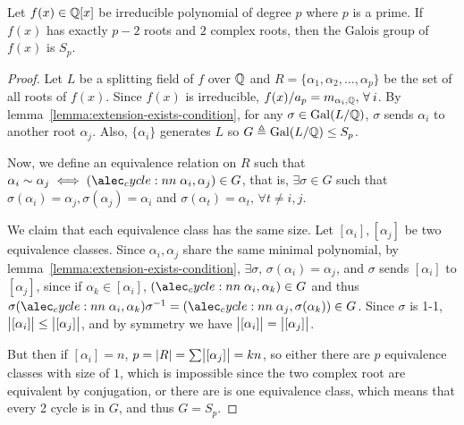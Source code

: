 \begin{prop}
  Let $f(x) \in \mathbb{Q}[x]$ be irreducible polynomial of degree $p$ where $p$ is a prime.
  If $f(x)$ has exactly $p-2$ roots and $2$ complex roots, then the Galois group of $f(x)$ is $S_p$.

  \begin{proof}
    Let $L$ be a splitting field of $f$ over $\mathbb{Q}$ and $R = \{ \alpha_1, \alpha_2, \dots, \alpha_p \}$ be
    the set of all roots of $f(x)$. Since $f(x)$ is irreducible, $f(x) / a_p = m_{\alpha_i, \Qb}, \, \forall i$.
    By lemma~\ref{lemma:extension-exists-condition}, for any $\sigma \in \operatorname{Gal}(L/\mathbb{Q})$, $\sigma$ sends
    $\alpha_i$ to another root $\alpha_j$. Also, $\{\alpha_i\}$ generates $L$ so
    $G \triangleq \operatorname{Gal}(L/\mathbb{Q}) \leq S_p$.

    Now, we define an equivalence relation on $R$ such that $\alpha_i \sim \alpha_j \iff
    \cycle{\alpha_i, \alpha_j} \in G$, that is, $\exists \sigma \in G$ such that $\sigma(\alpha_i) = \alpha_j,
    \sigma(\alpha_j) = \alpha_i$ and $\sigma(\alpha_t) = \alpha_t, \, \forall t \neq i, j$.

    We claim that each equivalence class has the same size. Let $[\alpha_i], [\alpha_j]$ be
    two equivalence classes. Since $\alpha_i, \alpha_j$ share the same minimal polynomial,
    by lemma~\ref{lemma:extension-exists-condition}, $\exists \sigma,\, \sigma(\alpha_i) = \alpha_j$,
    and $\sigma$ sends $[\alpha_i]$ to $[\alpha_j]$, since if $\alpha_k \in [\alpha_i]$,
    $\cycle{\alpha_i, \alpha_k} \in G$ and thus $\sigma \cycle{\alpha_i, \alpha_k} \sigma^{-1}
    = \cycle{\alpha_j, \sigma(\alpha_k)} \in G$. Since $\sigma$ is 1-1,
    $\abs[\big ]{[\alpha_i]} \leq \abs[\big ]{[\alpha_j]}$,
    and by symmetry we have $\abs[\big ]{[\alpha_i]} = \abs[\big ]{[\alpha_j]}$.

    But then if $[\alpha_i] = n$, $p = \abs{R} = \sum \abs[\big ]{[\alpha_j]} = kn$,
    so either there are $p$ equivalence classes with size of $1$, which is impossible since
    the two complex root are equivalent by conjugation, or there are is one equivalence class,
    which means that every 2 cycle is in $G$, and thus $G = S_p$.
  \end{proof}
\end{prop}

